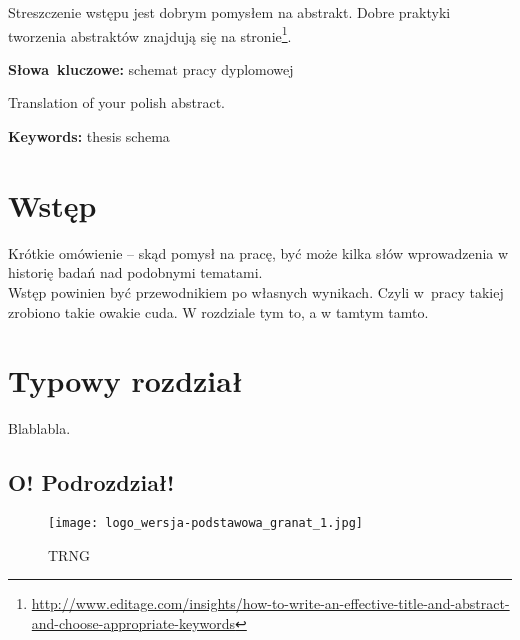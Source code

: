 \documentclass[12pt,a4paper,leqno,oneside,titlepage]{book}
\newenvironment{abstractpage}
  {\cleardoublepage\vspace*{\fill}\thispagestyle{empty}}
  {\vfill\cleardoublepage}
\newenvironment{abstract}[1]
  {\bigskip\selectlanguage{#1}%
   \begin{center}\bfseries\abstractname\end{center}}
  {\par\bigskip}
\begin{document}
\begin{abstractpage}
\begin{abstract}{polish}
Streszczenie wstępu jest dobrym pomysłem na abstrakt. Dobre praktyki tworzenia abstraktów znajdują się na stronie\footnote{
\url{http://www.editage.com/insights/how-to-write-an-effective-title-and-abstract-and-choose-appropriate-keywords}}.
\end{abstract}
\smallskip
\noindent \textbf{Słowa~kluczowe:} schemat pracy dyplomowej

\begin{abstract}{english}
Translation of your polish abstract.
\end{abstract}
\smallskip
\noindent \textbf{Keywords:} thesis schema
\end{abstractpage}

\mainmatter


\chapter*{Wstęp}

Krótkie omówienie -- skąd pomysł na pracę, być może kilka słów wprowadzenia w historię badań nad podobnymi tematami.\\

Wstęp powinien być przewodnikiem po własnych wynikach. Czyli w~pracy takiej zrobiono takie owakie cuda. W rozdziale tym to, a w tamtym tamto.

\chapter{Typowy rozdział}

Blablabla.

\section{O! Podrozdział!}

\begin{figure}[h!]
  \centering
    \texttt{[image: logo\_wersja-podstawowa\_granat\_1.jpg]}
  \caption{TRNG\cite{Stallings11kryptografia}}
\end{figure}
\end{document}
